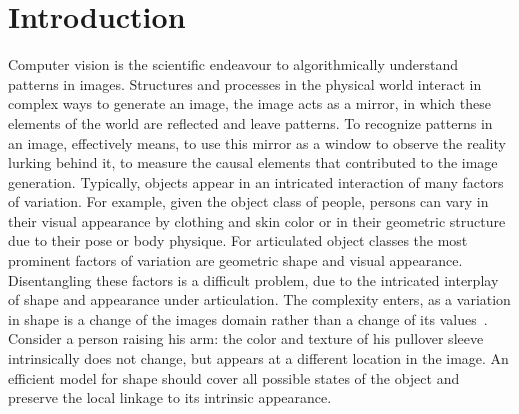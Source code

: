 \chapter{Introduction}
	Computer vision is the scientific endeavour to algorithmically understand patterns in images.
	Structures and processes in the physical world interact in complex ways to generate an image, the image acts as a mirror, in which these elements of the world are reflected and leave patterns.
	To recognize patterns in an image, effectively means, to use this mirror as a window to observe the reality lurking behind it, \ie to measure the causal elements that contributed to the image generation.
	Typically, objects appear in an intricated interaction of many factors of variation. 
	For example, given the object class of people, persons can vary in their visual appearance by clothing and skin color or in their geometric structure due to their pose or body physique.
	For articulated object classes the most prominent factors of variation are geometric shape and visual appearance.
	Disentangling these factors is a difficult problem, due to the intricated interplay of shape and appearance under articulation.
	The complexity enters, as a variation in shape is a change of the images domain rather than a change of its values~\cite{shu18shapeappear}.
	Consider a person raising his arm: the color and texture of his pullover sleeve intrinsically does not change, but appears at a different location in the image. An efficient model for shape should cover all possible states of the object and preserve the local linkage to its intrinsic appearance.


